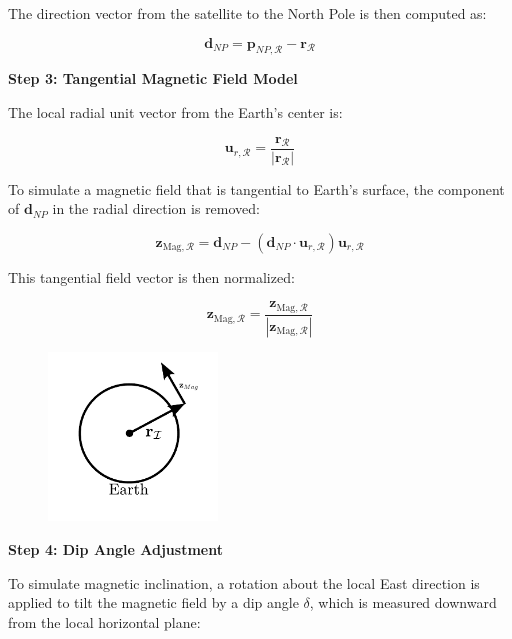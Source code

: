 The direction vector from the satellite to the North Pole is then computed as:

\begin{equation}
    \mathbf{d}_{NP} = \mathbf{p}_{NP,\mathcal{R}} - \mathbf{r}_{\mathcal{R}}
\end{equation}

\textbf{Step 3: Tangential Magnetic Field Model}

The local radial unit vector from the Earth's center is:

\begin{equation}
    \mathbf{u}_{r,\mathcal{R}} = \frac{\mathbf{r}_{\mathcal{R}}}{|\mathbf{r}_{\mathcal{R}}|}
\end{equation}

To simulate a magnetic field that is tangential to Earth's surface, the component of $\mathbf{d}_{NP}$ in the radial direction is removed:

\begin{equation}
    \mathbf{z}_{\text{Mag},\mathcal{R}} = \mathbf{d}_{NP} - (\mathbf{d}_{NP} \cdot \mathbf{u}_{r,\mathcal{R}})\mathbf{u}_{r,\mathcal{R}}
\end{equation}

This tangential field vector is then normalized:

\begin{equation}
    \mathbf{z}_{\text{Mag},\mathcal{R}} = \frac{\mathbf{z}_{\text{Mag},\mathcal{R}}}{|\mathbf{z}_{\text{Mag},\mathcal{R}}|}
\end{equation}

\begin{figure}[H]
    \centering
    \includegraphics[width=0.4\textwidth]{figures/modelling/Magnetometer.pdf}
    \caption{}
    \label{fig:CSS}
\end{figure}

\textbf{Step 4: Dip Angle Adjustment}

To simulate magnetic inclination, a rotation about the local East direction is applied to tilt the magnetic field by a dip angle $\delta$, which is measured downward from the local horizontal plane:

